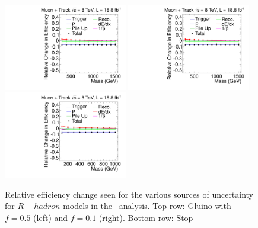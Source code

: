 \begin{figure}[ht]
\centering
  \includegraphics[clip=false, trim=0.0cm 0cm 0.0cm 0cm, width=0.48\textwidth]{figures/tkmu/MuGluino_f50Uncertainty}
  \includegraphics[clip=false, trim=0.0cm 0cm 0.0cm 0cm, width=0.48\textwidth]{figures/tkmu/MuGluino_f10Uncertainty}\\
  \includegraphics[clip=false, trim=0.0cm 0cm 0.0cm 0cm, width=0.48\textwidth]{figures/tkmu/MuStopUncertainty}
\caption[Relative efficiency change seen for the various sources of uncertainty for $R-hadron$ models in the \tktof\ analysis]
{Relative efficiency change seen for the various sources of uncertainty for $R-hadron$ models in the \tktof\ analysis.
Top row: Gluino with $f=0.5$ (left) and $f=0.1$ (right).
Bottom row: Stop}
    \label{fig:TkMuRHadUncSource}
\end{figure}

